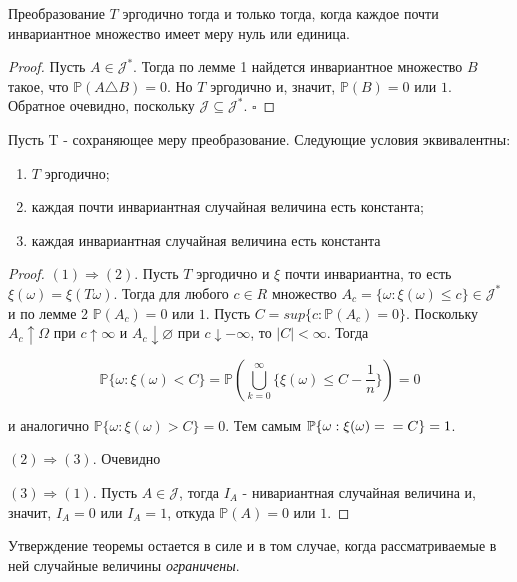 \begin{lemma} Преобразование $T$ эргодично тогда и только тогда, когда каждое почти инвариантное множество имеет меру нуль или единица.
\end{lemma}

\begin{proof} Пусть $A \in \mathscr{J}^*$. Тогда по лемме 1 найдется инвариантное множество $B$ такое, что $\mathbb{P}(A \triangle B) = 0$. Но $T$ эргодично и, значит, $\mathbb{P}(B) = 0$ или $1$. Обратное очевидно, поскольку $\mathscr{J} \subseteq \mathscr{J}^*$. $\square$
\end{proof}

\begin{theorem} Пусть T - сохраняющее меру преобразование. Следующие условия эквивалентны:
\begin{enumerate}
    \item $T$ эргодично;
    \item каждая почти инвариантная случайная величина есть константа;
    \item каждая инвариантная случайная величина есть константа
\end{enumerate}
\end{theorem}

\begin{proof} $(1) \Rightarrow (2)$. Пусть $T$ эргодично и $\xi$ почти инвариантна, то есть $\xi(\omega) = \xi(T\omega)$. Тогда для любого $c \in R$ множество $A_c = \{\omega: \xi(\omega) \leq c\} \in \mathscr{J}^*$ и по лемме 2 $\mathbb{P}(A_c) = 0$ или $1$. Пусть $C = sup\{c: \mathbb{P}(A_c) = 0\}$. Поскольку $A_c \uparrow \Omega$ при $c \uparrow \infty$ и $A_c \downarrow \varnothing$ при $c \downarrow -\infty$, то $|C| < \infty$. Тогда

{\centering 
$$\mathbb{P}\{\omega: \xi(\omega) < C\} = \mathbb{P}(\bigcup\limits_{k=0}^{\infty} \{\xi(\omega) \leq C - \frac{1}{n}\}) = 0$$ 
\par}

\noindent и аналогично $\mathbb{P}\{\omega: \xi(\omega) > C\} = 0$. Тем самым $\mathbb{P}\{\omega: \xi(\omega) = \\ = C\} = 1$.

$(2) \Rightarrow (3)$. Очевидно

$(3) \Rightarrow (1)$. Пусть $A \in \mathscr{J}$, тогда $I_A$ - нивариантная случайная величина и, значит, $I_A = 0$ или $I_A = 1$, откуда $\mathbb{P}(A) = 0$ или $1$. 
\end{proof}

\begin{remark} Утверждение теоремы остается в силе и в том случае, когда рассматриваемые в ней случайные величины \textit{ограничены}.
\end{remark}

